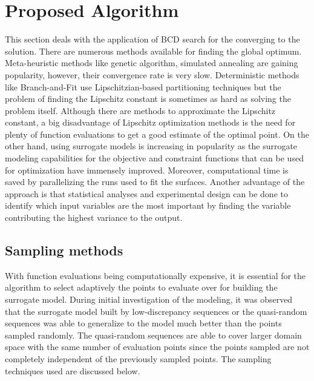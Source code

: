 \chapter{Proposed Algorithm}

This section deals with the application of BCD search for the converging to the solution. There are numerous methods available for finding the global optimum. \cite{Forrester2008}
Meta-heuristic methods like genetic algorithm, simulated annealing are gaining popularity, however, their convergence rate is very slow. Deterministic methods like Branch-and-Fit use Lipschitzian-based partitioning techniques but the problem of finding the Lipschitz constant is sometimes as hard as solving the problem itself. \cite{Strongin1973}  Although there are methods to approximate the Lipschitz constant, a big disadvantage of Lipschitz optimization methods is the need for plenty of function evaluations to get a good estimate of the optimal point. 
On the other hand, using surrogate models is increasing in popularity as the surrogate modeling capabilities for the objective and constraint functions that can be used for optimization have immensely improved. Moreover, computational time is saved by parallelizing the runs used to fit the surfaces. \cite{Jones2001}
Another advantage of the approach is that statistical analyses and experimental design can be done to identify which input variables are the most important by finding the variable contributing the highest variance to the output.

\begin{algorithm}
   
\end{algorithm}

\section{Sampling methods}
With function evaluations being computationally expensive, it is essential for the algorithm to select adaptively the points to evaluate over for building the surrogate model. During initial investigation of the modeling, it was observed that the surrogate model built by low-discrepancy sequences or the quasi-random sequences was able to generalize to the model much better than the points sampled randomly. 
The quasi-random sequences are able to cover larger domain space with the same number of evaluation points since the points sampled are not completely independent of the previously sampled points. The sampling techniques used are discussed below.

